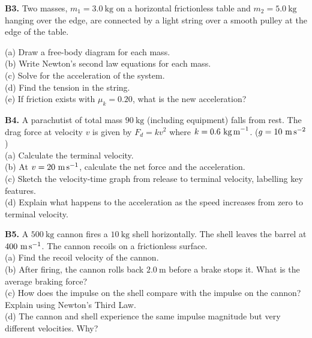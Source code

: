 \begin{exercisebox}[4]
\textbf{B3.} Two masses, $m_1 = 3.0\ \text{kg}$ on a
horizontal frictionless table and $m_2 = 5.0\ \text{kg}$
hanging over the edge, are connected by a light string
over a smooth pulley at the edge of the table.\\[4pt]
\begin{center}
\end{center}
(a) Draw a free-body diagram for each mass.\\
(b) Write Newton's second law equations for each mass.\\
(c) Solve for the acceleration of the system.\\
(d) Find the tension in the string.\\
(e) If friction exists with $\mu_k = 0.20$, what is
the new acceleration?
\hfill{}

\vspace{0.4cm}

\textbf{B4.} A parachutist of total mass $90\ \text{kg}$
(including equipment) falls from rest. The drag force
at velocity $v$ is given by $F_d = kv^2$ where
$k = 0.6\ \text{kg\,m}^{-1}$. ($g = 10\ \text{m\,s}^{-2}$)\\[4pt]
(a) Calculate the terminal velocity.\\
(b) At $v = 20\ \text{m\,s}^{-1}$, calculate the net
force and the acceleration.\\
(c) Sketch the velocity-time graph from release to
terminal velocity, labelling key features.\\
(d) Explain what happens to the acceleration as the
speed increases from zero to terminal velocity.
\hfill{}

\vspace{0.4cm}

\textbf{B5.} A $500\ \text{kg}$ cannon fires a
$10\ \text{kg}$ shell horizontally. The shell leaves
the barrel at $400\ \text{m\,s}^{-1}$. The cannon
recoils on a frictionless surface.\\[4pt]
(a) Find the recoil velocity of the cannon.\\
(b) After firing, the cannon rolls back $2.0\ \text{m}$
before a brake stops it. What is the average braking
force?\\
(c) How does the impulse on the shell compare with
the impulse on the cannon? Explain using Newton's
Third Law.\\
(d) The cannon and shell experience the same impulse
magnitude but very different velocities. Why?
\hfill{}

\end{exercisebox}
